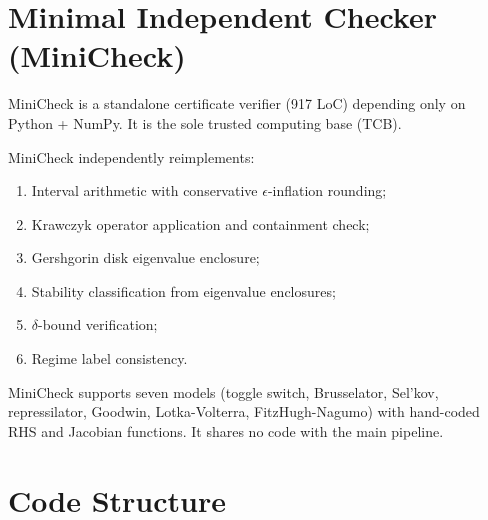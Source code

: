 \documentclass[11pt]{article}
\begin{document}
\section{Minimal Independent Checker (MiniCheck)}
\label{sec:minicheck}

MiniCheck is a standalone certificate verifier (917 LoC) depending only on Python + NumPy.
It is the sole trusted computing base (TCB).

MiniCheck independently reimplements:
\begin{enumerate}[leftmargin=*]
\item Interval arithmetic with conservative $\epsilon$-inflation rounding;
\item Krawczyk operator application and containment check;
\item Gershgorin disk eigenvalue enclosure;
\item Stability classification from eigenvalue enclosures;
\item $\delta$-bound verification;
\item Regime label consistency.
\end{enumerate}

MiniCheck supports seven models (toggle switch, Brusselator, Sel'kov, repressilator, Goodwin, Lotka-Volterra, FitzHugh-Nagumo) with hand-coded RHS and Jacobian functions.
It shares no code with the main pipeline.

\section{Code Structure}
\label{sec:code}
\end{document}
